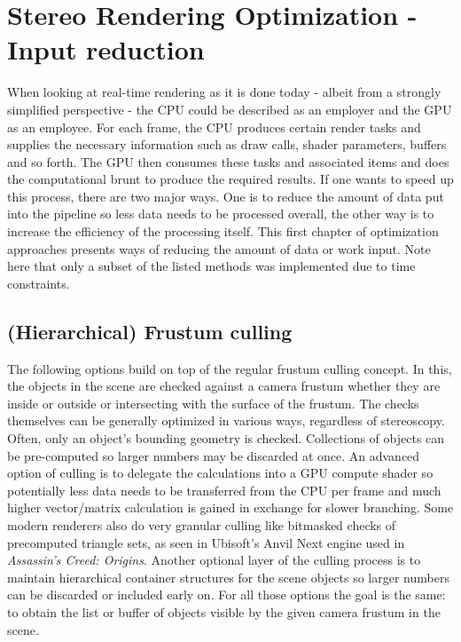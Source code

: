 
\chapter{Stereo Rendering Optimization - Input reduction}
When looking at real-time rendering as it is done today - albeit from a strongly simplified perspective - the CPU could be described as an employer and the GPU as an employee. For each frame, the CPU produces certain render tasks and supplies the necessary information such as draw calls, shader parameters, buffers and so forth. The GPU then consumes these tasks and associated items and does the computational brunt to produce the required results. 
If one wants to speed up this process, there are two major ways. One is to reduce the amount of data put into the pipeline so less data needs to be processed overall, the other way is to increase the efficiency of the processing itself.  
This first chapter of optimization approaches presents ways of reducing the amount of data or work input. 
Note here that only a subset of the listed methods was implemented due to time constraints. 

\section{(Hierarchical) Frustum culling}
The following options build on top of the regular frustum culling concept. In this, the objects in the scene are checked against a camera frustum whether they are inside or outside or intersecting with the surface of the frustum. The checks themselves can be generally optimized in various ways, regardless of stereoscopy. Often, only an object's bounding geometry is checked. Collections of objects can be pre-computed so larger numbers may be discarded at once. An advanced option of culling is to delegate the calculations into a GPU compute shader so potentially less data needs to be transferred from the CPU per frame and much higher vector/matrix calculation is gained in exchange for slower branching. Some modern renderers also do very granular culling like bitmasked checks of precomputed triangle sets, as seen in Ubisoft's Anvil Next engine used in \textit{Assassin's Creed: Origins}\cite{Haar.2015}. 
Another optional layer of the culling process is to maintain hierarchical container structures for the scene objects so larger numbers can be discarded or included early on. 
For all those options the goal is the same: to obtain the list or buffer of objects visible by the given camera frustum in the scene. 

